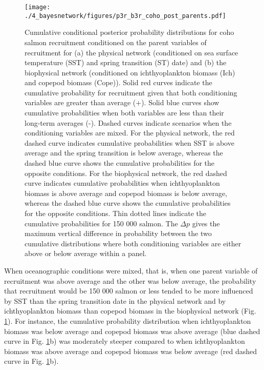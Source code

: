 \begin{figure}[htbp]
  \centering \texttt{[image: ./4\_bayesnetwork/figures/p3r\_b3r\_coho\_post\_parents.pdf]}
  \caption[Cumulative conditional posterior probability distributions for coho
           salmon recruitment conditioned on the parent variables of
           recruitment]{Cumulative conditional posterior probability
           distributions for coho salmon recruitment conditioned on the parent
           variables of recruitment for (a) the physical network (conditioned on
           sea surface temperature (SST) and spring transition (ST) date) and
           (b) the biophysical network (conditioned on ichthyoplankton biomass
           (Ich) and copepod biomass (Cope)). Solid red curves indicate
           the cumulative probability for recruitment given that both
           conditioning variables are greater than average (+). Solid
           blue curves show cumulative probabilities when both variables are
           less than their long-term averages (-). Dashed curves indicate
           scenarios when the conditioning variables are mixed. For the physical
           network, the red dashed curve indicates cumulative probabilities
           when SST is above average and the spring transition is below average,
           whereas the dashed blue curve shows the cumulative probabilities for
           the opposite conditions. For the biophysical network, the red dashed
           curve indicates cumulative probabilities when ichthyoplankton biomass
           is above average and copepod biomass is below average, whereas the
           dashed blue curve shows the cumulative probabilities for the
           opposite conditions. Thin dotted lines indicate the cumulative
           probabilities for 150 000 salmon.  The \(\Delta p\) gives the maximum
           vertical difference in probability between the two cumulative
           distributions where both conditioning variables are either above or
           below average within a panel.}
  \label{fig:bn:8}
\end{figure}

When oceanographic conditions were mixed, that is, when one parent variable of
recruitment was above average and the other was below average, the probability
that recruitment would be 150 000 salmon or less tended to be more influenced by
SST than the spring transition date in the physical network and by
ichthyoplankton biomass than copepod biomass in the biophysical network (Fig.
\ref{fig:bn:8}). For instance, the cumulative probability distribution when
ichthyoplankton biomass was below average and copepod biomass was above average
(blue dashed curve in Fig. \ref{fig:bn:8}b) was moderately steeper compared to
when ichthyoplankton biomass was above average and copepod biomass was below
average (red dashed curve in Fig. \ref{fig:bn:8}b).


